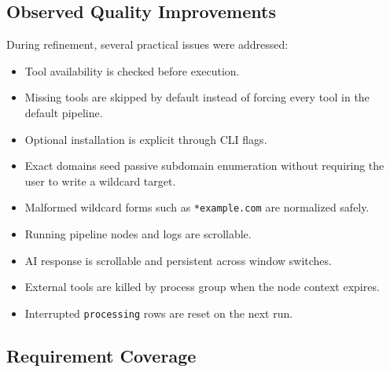 \documentclass[a4paper,12pt]{article}
\begin{document}
\subsection{Observed Quality Improvements}

During refinement, several practical issues were addressed:

\begin{itemize}
    \item Tool availability is checked before execution.
    \item Missing tools are skipped by default instead of forcing every tool in the default pipeline.
    \item Optional installation is explicit through CLI flags.
    \item Exact domains seed passive subdomain enumeration without requiring the user to write a wildcard target.
    \item Malformed wildcard forms such as \texttt{*example.com} are normalized safely.
    \item Running pipeline nodes and logs are scrollable.
    \item AI response is scrollable and persistent across window switches.
    \item External tools are killed by process group when the node context expires.
    \item Interrupted \texttt{processing} rows are reset on the next run.
\end{itemize}

\subsection{Requirement Coverage}
\end{document}
